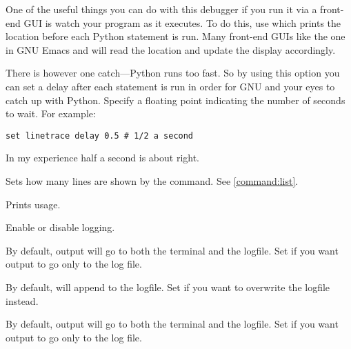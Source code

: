 \begin{description}
One of the useful things you can do with this debugger if you run it
via a front-end GUI is watch your program as it executes. To do this,
use  which prints the location before each
Python statement is run. Many front-end GUIs like the one in GNU Emacs
and  will read the location and update the display
accordingly.

There is however one catch---Python runs too fast. So by using this
option you can set a delay after each statement is run in order for
GNU and your eyes to catch up with Python. Specify a floating
point indicating the number of seconds to wait. For example: 

\begin{verbatim}
set linetrace delay 0.5 # 1/2 a second
\end{verbatim}

In my experience half a second is about right.

\item[set listsize \var{lines}]\label{command:listsize}

Sets how many lines are shown by the  command. See
\ref{command:list}.

\item[set logging]\label{command:logging}

Prints  usage.

\item[set logging on\code{\Large{|}}off]\label{command:logging}

Enable or disable logging.

\item[set logging file \var{filename}]\label{command:log-redirect}

By default,  output will go to both the terminal and the
logfile.  Set  if you want output to go only to the log
file.

\item[set logging overwrite on\code{\Large{|}}off]\label{command:log-overwrite}

By default,  will append to the logfile.  Set
 if you want  to overwrite the
logfile instead.

\item[set logging redirect on\code{\Large{|}}off]\label{command:log-redirect}

By default,  output will go to both the terminal and the
logfile.  Set  if you want output to go only to the log
file.


\end{description}
